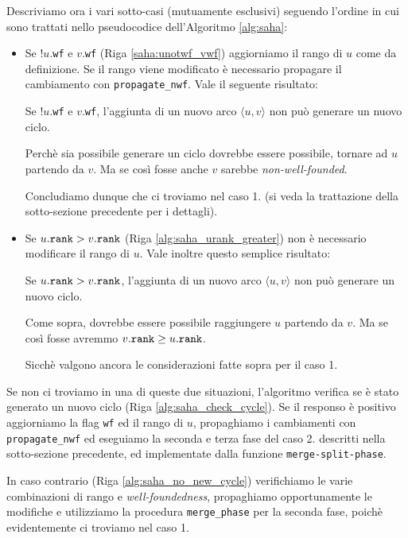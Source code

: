 Descriviamo ora i vari sotto-casi (mutuamente esclusivi) seguendo l'ordine in cui sono trattati nello pseudocodice dell'Algoritmo \ref{alg:saha}:
\begin{itemize}
    \item Se !$u$.\texttt{wf} e $v$.\texttt{wf} (Riga \ref{saha:unotwf_vwf}) aggiorniamo il rango di $u$ come da definizione. Se il rango viene modificato è necessario propagare il cambiamento con \texttt{propagate\_nwf}. Vale il seguente risultato:
    \begin{observation}
        Se !$u$.\texttt{wf} e $v$.\texttt{wf}, l'aggiunta di un nuovo arco $\langle u,v \rangle$ non può generare un nuovo ciclo.
    \end{observation}
    \begin{proof2}
        Perchè sia possibile generare un ciclo dovrebbe essere possibile, tornare ad $u$ partendo da $v$. Ma se così fosse anche $v$ sarebbe \emph{non-well-founded}.
    \end{proof2}
    Concludiamo dunque che ci troviamo nel caso 1. (si veda la trattazione della sotto-sezione precedente per i dettagli).
    \item Se $u.\verb|rank| > v.\verb|rank|$ (Riga \ref{alg:saha_urank_greater}) non è necessario modificare il rango di $u$. Vale inoltre questo semplice risultato:
    \begin{observation}
        Se $u.\verb|rank| > v.\verb|rank|$, l'aggiunta di un nuovo arco $\langle u,v \rangle$ non può generare un nuovo ciclo.
    \end{observation}
    \begin{proof2}
        Come sopra, dovrebbe essere possibile raggiungere $u$ partendo da $v$. Ma se così fosse avremmo $v.\verb|rank| \geq u.\verb|rank|$.
    \end{proof2}
    Sicchè valgono ancora le considerazioni fatte sopra per il caso 1.
\end{itemize}
Se non ci troviamo in una di queste due situazioni, l'algoritmo verifica se è stato generato un nuovo ciclo (Riga \ref{alg:saha_check_cycle}). Se il responso è positivo aggiorniamo la flag \texttt{wf} ed il rango di $u$, propaghiamo i cambiamenti con \texttt{propagate\_nwf} ed eseguiamo la seconda e terza fase del caso 2. descritti nella sotto-sezione precedente, ed implementate dalla funzione \texttt{merge-split-phase}.

In caso contrario (Riga \ref{alg:saha_no_new_cycle}) verifichiamo le varie combinazioni di rango e \emph{well-foundedness}, propaghiamo opportunamente le modifiche e utilizziamo la procedura \texttt{merge\_phase} per la seconda fase, poichè evidentemente ci troviamo nel caso 1.

